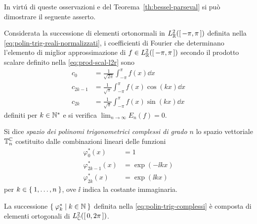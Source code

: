	In virtú di queste osservazioni e del Teorema~\ref{th:bessel-parseval} si può dimostrare il seguente asserto.
	
	\begin{teorema}
		Considerata la successione di elementi ortonormali in \(L^2_\mathbb{R} ([\,- \pi, \pi \,])\) definita nella \eqref{eq:polin-trig-reali-normalizzati}, i coefficienti di Fourier che determinano l'elemento di miglior approssimazione di \(f \in L^2_\mathbb{R} ([\,- \pi, \pi \,])\) secondo il prodotto scalare definito nella \eqref{eq:prod-scal-l2r} sono
		\begin{subequations}
			\begin{align}
				c_0         & = \frac{1}{\sqrt{2 \pi}} \int_{- \pi}^\pi f (x) \dd{x}          \\
				c_{2 k - 1} & = \frac{1}{\sqrt{\pi}} \int_{- \pi}^\pi f (x) \cos (k x) \dd{x} \\
				c_{2 k}     & = \frac{1}{\sqrt{\pi}} \int_{- \pi}^\pi f (x) \sin (k x) \dd{x}
			\end{align}
		\end{subequations}
		definiti per \(k \in \mathbb{N}^*\) e si verifica \(\lim_{n \to \infty} E_n (f) = 0\).
	\end{teorema}

	\begin{definizione}\label{def:polin-trig-complessi}
		Si dice \emph{spazio dei polinomi trigonometrici complessi di grado \(n\)} lo spazio vettoriale \(\mathbb{T}_n^\mathbb{C}\) costituito dalle combinazioni lineari delle funzioni
		\begin{subequations}\label{eq:polin-trig-complessi}
			\begin{align}
				\varphi_0^* (x)         & = 1              \\
				\varphi_{2 k - 1}^* (x) & = \exp (- \ii k x) \\
				\varphi_{2 k}^* (x)     & = \exp (\ii k x)
			\end{align}
		\end{subequations}
		per \(k \in \Set{1, \dots, n}\), ove \(\ii\) indica la costante immaginaria.
	\end{definizione}

	\begin{teorema}
		La successione \(\Set{\varphi_k^* | k \in \mathbb{N}}\) definita nella \eqref{eq:polin-trig-complessi} è composta di elementi ortogonali di \(L^2_\mathbb{C} ([\, 0, 2 \pi \,])\).
	\end{teorema}
	
